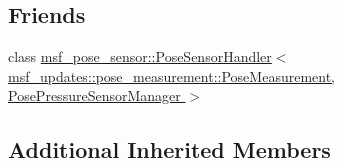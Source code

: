 \subsection*{Friends}
\begin{DoxyCompactItemize}
\item 
class \hyperlink{classmsf__pose__pressure__sensor_1_1PosePressureSensorManager_adfcf881b28c0e4830af27a9c7bd7676b}{msf\-\_\-pose\-\_\-sensor\-::\-Pose\-Sensor\-Handler$<$ msf\-\_\-updates\-::pose\-\_\-measurement\-::\-Pose\-Measurement, Pose\-Pressure\-Sensor\-Manager $>$}
\end{DoxyCompactItemize}
\subsection*{Additional Inherited Members}


